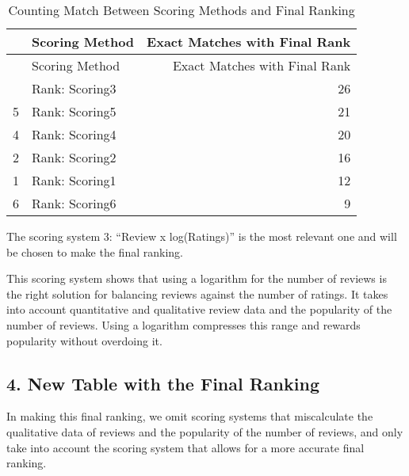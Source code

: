 \documentclass[
]{article}
\begin{document}
\begin{longtable}[]{@{}llr@{}}
\caption{Counting Match Between Scoring Methods and Final
Ranking}\tabularnewline
\toprule\noalign{}
& Scoring Method & Exact Matches with Final Rank \\
\midrule\noalign{}
\endfirsthead
\toprule\noalign{}
& Scoring Method & Exact Matches with Final Rank \\
\midrule\noalign{}
\endhead
\bottomrule\noalign{}
\endlastfoot
3 & Rank: Scoring3 & 26 \\
5 & Rank: Scoring5 & 21 \\
4 & Rank: Scoring4 & 20 \\
2 & Rank: Scoring2 & 16 \\
1 & Rank: Scoring1 & 12 \\
6 & Rank: Scoring6 & 9 \\
\end{longtable}

The scoring system 3: ``Review x log(Ratings)'' is the most relevant one
and will be chosen to make the final ranking.

This scoring system shows that using a logarithm for the number of
reviews is the right solution for balancing reviews against the number
of ratings. It takes into account quantitative and qualitative review
data and the popularity of the number of reviews. Using a logarithm
compresses this range and rewards popularity without overdoing it.

\subsection{4. New Table with the Final
Ranking}\label{new-table-with-the-final-ranking}

In making this final ranking, we omit scoring systems that miscalculate
the qualitative data of reviews and the popularity of the number of
reviews, and only take into account the scoring system that allows for a
more accurate final ranking.
\end{document}
